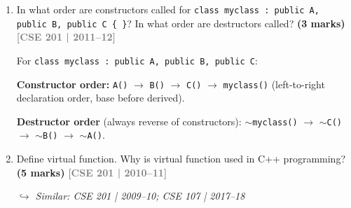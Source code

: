 \documentclass[12pt,a3paper]{article}
\newcommand{\yr}[1]{\hfill\textcolor{gray}{\small\textbf{[#1]}}}
\newcommand{\mk}[1]{\textcolor{orange!70!black}{\small\textbf{(#1 marks)}}}
\newcommand{\variant}[1]{\par\vspace{1pt}\textcolor{blue!50!black}%
  {\footnotesize\textit{$\hookrightarrow$ Similar: #1}}}
\begin{document}
\begin{enumerate}
\begin{tcolorbox}
\textbf{Key rules:}
\begin{itemize}[itemsep=2pt]
  \item \textbf{private members} of the base are \emph{never}
    accessible in derived classes regardless of inheritance type.
  \item \textbf{public inheritance} preserves the original access
    levels (IS-A relationship).
  \item \textbf{protected inheritance} limits public members to
    protected in the derived class.
  \item \textbf{private inheritance} makes everything private in the
    derived class.
\end{itemize}

\end{tcolorbox}



\item In what order are constructors called for \texttt{class myclass : public A, public B, public C \{ \}}? In what order are destructors called? \mk{3}
\yr{CSE 201 | 2011--12}
\begin{tcolorbox}[enhanced,breakable,ansbox,colback=cG!4,colframe=cG,
  boxrule=0.8pt,arc=5pt,
  title={\textbf{Answer --- Constructor/destructor order for class D : public A, public B, public C}},
  fonttitle=\bfseries\color{white},colbacktitle=cG]

For \texttt{class myclass : public A, public B, public C}:

\textbf{Constructor order:} \texttt{A()} $\to$ \texttt{B()} $\to$
\texttt{C()} $\to$ \texttt{myclass()} (left-to-right declaration
order, base before derived).

\textbf{Destructor order} (always reverse of constructors):
\texttt{$\sim$myclass()} $\to$ \texttt{$\sim$C()} $\to$
\texttt{$\sim$B()} $\to$ \texttt{$\sim$A()}.

\end{tcolorbox}


\item Define virtual function. Why is virtual function used in C++ programming? \mk{5}
\yr{CSE 201 | 2010--11}
\variant{CSE 201 | 2009--10; CSE 107 | 2017--18}

\begin{tcolorbox}[enhanced,breakable,ansbox,colback=cG!4,colframe=cG,
  boxrule=0.8pt,arc=5pt,
  title={\textbf{Answer --- Virtual function --- definition and purpose}},
  fonttitle=\bfseries\color{white},colbacktitle=cG]


\end{tcolorbox}
\end{enumerate}
\end{document}
